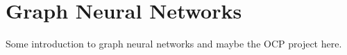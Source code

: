 \section{Graph Neural Networks}

Some introduction to graph neural networks and maybe the OCP project here.